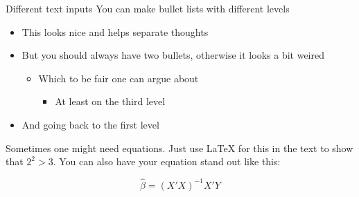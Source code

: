 \documentclass[11pt, aspectratio=169, t]{beamer}
\def\tightlist{}
\def\tightlist{}
\providecommand{\tightlist}{%
	\setlength{\itemsep}{0pt}\setlength{\parskip}{0pt}}
\begin{document}
\begin{frame}{Different text inputs}
\protect\hypertarget{different-text-inputs}{}
You can make bullet lists with different levels

\begin{itemize}
\tightlist
\item
  This looks nice and helps separate thoughts
\item
  But you should always have two bullets, otherwise it looks a bit
  weired

  \begin{itemize}
  \tightlist
  \item
    Which to be fair one can argue about

    \begin{itemize}
    \tightlist
    \item
      At least on the third level
    \end{itemize}
  \end{itemize}
\item
  And going back to the first level
\end{itemize}

Sometimes one might need equations. Just use LaTeX for this in the text
to show that \(2^{2} > 3\). You can also have your equation stand out
like this:

\[\hat{\beta} = (X'X)^{-1} X'Y\]
\end{frame}
\end{document}
